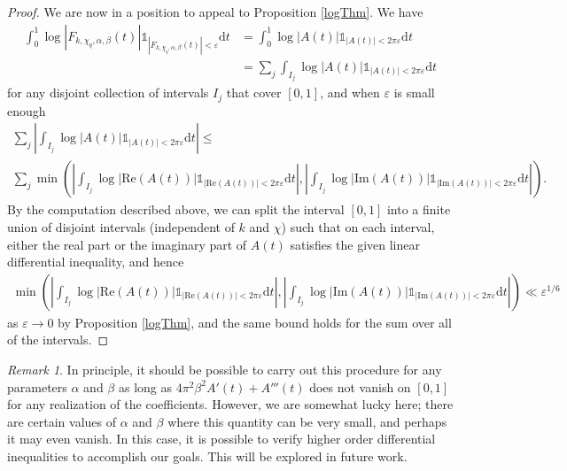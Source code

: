 \documentclass[12pt, a4paper]{amsart}
\theoremstyle{remark}
\newtheorem*{remark}{Remark}
\newcommand{\ud}{\mathrm{d}}
\newcommand{\abs}[1]{\left|#1\right|}
\newcommand{\real}{\mathrm{Re}}
\newcommand{\imag}{\mathrm{Im}}
\begin{document}
\begin{proof}
We are now in a position to appeal to Proposition \ref{logThm}. We have
\begin{align*}
    \int_0^1 \log \abs{F_{k,\chi_q,\alpha,\beta}(t)}\mathds{1}_{\abs{F_{k,\chi_q,\alpha,\beta}(t)}
    < \varepsilon} \ud t
        &= \int_0^1 \log \abs{A(t)}\mathds{1}_{\abs{A(t)} < 2 \pi \varepsilon} \ud t \\
        &= \sum_{j} \int_{I_j} \log \abs{A(t)}\mathds{1}_{\abs{A(t)} < 2 \pi \varepsilon} \ud t
\end{align*}
for any disjoint collection of intervals $I_j$ that cover $[0,1]$, and when
$\varepsilon$ is small enough
\begin{multline*}
    \sum_{j} \abs{\int_{I_j} \log \abs{A(t)}\mathds{1}_{\abs{A(t)} < 2 \pi \varepsilon} \ud t}
\le \\
\sum_{j} \min \left(
    \abs{\int_{I_j} \log \abs{\real(A(t))}\mathds{1}_{\abs{\real(A(t))} < 2 \pi \varepsilon} \ud t},
    \abs{\int_{I_j} \log \abs{\imag(A(t))}\mathds{1}_{\abs{\imag(A(t))} < 2 \pi \varepsilon} \ud t}\right).
\end{multline*}
By the computation described above, we can split the interval $[0,1]$ into a
finite union of disjoint intervals (independent of $k$ and $\chi$) such
that on each interval, either the real part or the imaginary part of $A(t)$
satisfies the given linear differential inequality, and hence
\begin{multline*}
\min \left(
    \abs{\int_{I_j} \log \abs{\real(A(t))}\mathds{1}_{\abs{\real(A(t))} < 2 \pi \varepsilon} \ud t},
    \abs{\int_{I_j} \log \abs{\imag(A(t))}\mathds{1}_{\abs{\imag(A(t))} < 2 \pi \varepsilon} \ud t}\right)
    \ll
    \varepsilon^{1/6}
\end{multline*}
as $\varepsilon \rightarrow 0$ by Proposition \ref{logThm}, and the same bound
holds for the sum over all of the intervals.
\end{proof}

\begin{remark}
    In principle, it should be possible to carry out this procedure
    for any parameters $\alpha$ and $\beta$ as long as $4\pi^2\beta^2 A'(t) +
    A'''(t)$ does not vanish on $[0,1]$ for any realization of the
    coefficients. However, we are somewhat lucky here; there are
    certain values of $\alpha$ and $\beta$ where this quantity can be very
    small, and perhaps it may even vanish. In this case, it
    is possible to verify higher order differential inequalities to
    accomplish our goals. This will be explored in future work.
\end{remark}
\end{document}
